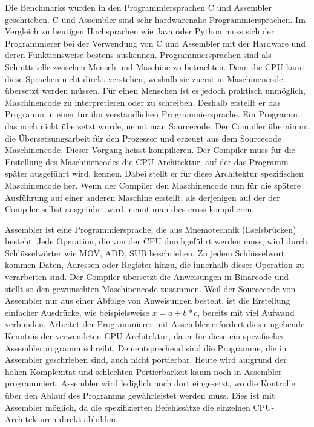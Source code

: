 Die Benchmarks wurden in den Programmiersprachen C und Assembler geschrieben. C und Assembler sind sehr hardwarenahe Programmiersprachen. Im Vergleich zu heutigen Hochsprachen wie Java oder Python muss sich der Programmierer bei der Verwendung von C und Assembler mit der Hardware und deren Funktionsweise bestens auskennen. Programmiersprachen sind als Schnittstelle zwischen Mensch und Maschine zu betrachten. Denn die CPU kann diese Sprachen nicht direkt verstehen, weshalb sie zuerst in Maschinencode übersetzt werden müssen. Für einen Menschen ist es jedoch praktisch unmöglich, Maschinencode zu interpretieren oder zu schreiben. Deshalb erstellt er das Programm in einer für ihn verständlichen Programmiersprache. Ein Programm, das noch nicht übersetzt wurde, nennt man Sourcecode. Der Compiler übernimmt die Übersetzungsarbeit für den Prozessor und erzeugt aus dem Sourcecode Maschinencode. Dieser Vorgang heisst kompilieren.  Der Compiler muss für die Erstellung des Maschinencodes die CPU-Architektur, auf der das Programm später ausgeführt wird, kennen. Dabei stellt er für diese Architektur spezifischen Maschinencode her. Wenn der Compiler den Maschinencode nun für die spätere Ausführung auf einer anderen Maschine erstellt, als derjenigen auf der der Compiler selbst ausgeführt wird, nennt man dies cross-kompilieren.
\par
Assembler ist eine Programmiersprache, die aus Mnemotechnik (Eselsbrücken) besteht. Jede Operation, die von der CPU durchgeführt werden muss, wird durch Schlüsselwörter wie MOV, ADD, SUB beschrieben. Zu jedem Schlüsselwort kommen Daten, Adressen oder Register hinzu, die innerhalb dieser Operation zu verarbeiten sind. Der Compiler übersetzt die Anweisungen in Binärcode und stellt so den gewünschten Maschinencode zusammen. Weil der Sourcecode von Assembler nur aus einer Abfolge von Anweisungen besteht, ist die Erstellung einfacher Ausdrücke, wie beispielsweise $x = a + b * c$, bereits mit viel Aufwand verbunden. Arbeitet der Programmierer mit Assembler erfordert dies eingehende Kenntnis der verwendeten CPU-Architektur, da er für diese ein spezifisches Assemblerprogramm schreibt. Dementsprechend sind die Programme, die in Assembler geschrieben sind, auch nicht portierbar. Heute wird aufgrund der hohen Komplexität und schlechten Portierbarkeit kaum noch in Assembler programmiert. Assembler wird lediglich noch dort eingesetzt, wo die Kontrolle über den Ablauf des Programms gewährleistet werden muss. Dies ist mit Assembler möglich, da die spezifizierten Befehlssätze die einzelnen CPU-Architekturen direkt abbilden.
